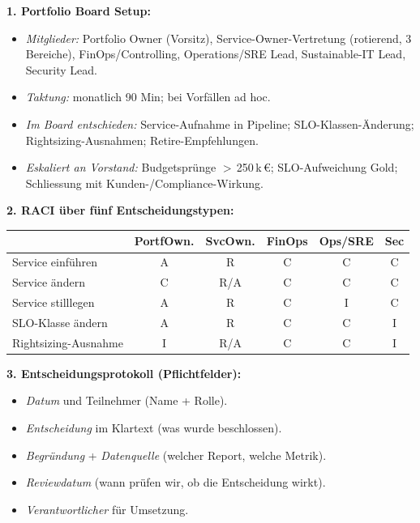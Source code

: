 \documentclass[11pt,a4paper,oneside]{article}
\begin{document}
\begin{loesungbox}
\textbf{1. Portfolio Board Setup:}
\begin{itemize}
  \item \emph{Mitglieder:} Portfolio Owner (Vorsitz), Service-Owner-Vertretung (rotierend, 3 Bereiche), FinOps/Controlling, Operations/SRE Lead, Sustainable-IT Lead, Security Lead.
  \item \emph{Taktung:} monatlich 90 Min; bei Vorf\"allen ad hoc.
  \item \emph{Im Board entschieden:} Service-Aufnahme in Pipeline; SLO-Klassen-\"Anderung; Rightsizing-Ausnahmen; Retire-Empfehlungen.
  \item \emph{Eskaliert an Vorstand:} Budgetspr\"unge $>$\,250\,k\,\euro{}; SLO-Aufweichung Gold; Schliessung mit Kunden-/Compliance-Wirkung.
\end{itemize}

\smallskip
\textbf{2. RACI \"uber f\"unf Entscheidungstypen:}

\smallskip
\begin{tabularx}{\linewidth}{@{}p{3.4cm}ccccc@{}}
\toprule
 & \textbf{PortfOwn.} & \textbf{SvcOwn.} & \textbf{FinOps} & \textbf{Ops/SRE} & \textbf{Sec} \\
\midrule
Service einf\"uhren        & A    & R   & C   & C   & C \\
Service \"andern           & C    & R/A & C   & C   & C \\
Service stilllegen         & A    & R   & C   & I   & C \\
SLO-Klasse \"andern        & A    & R   & C   & C   & I \\
Rightsizing-Ausnahme       & I    & R/A & C   & C   & I \\
\bottomrule
\end{tabularx}

\smallskip
\textbf{3. Entscheidungsprotokoll (Pflichtfelder):}
\begin{itemize}
  \item \emph{Datum} und Teilnehmer (Name + Rolle).
  \item \emph{Entscheidung} im Klartext (was wurde beschlossen).
  \item \emph{Begr\"undung} + \emph{Datenquelle} (welcher Report, welche Metrik).
  \item \emph{Reviewdatum} (wann pr\"ufen wir, ob die Entscheidung wirkt).
  \item \emph{Verantwortlicher} f\"ur Umsetzung.
\end{itemize}


\end{loesungbox}
\end{document}
